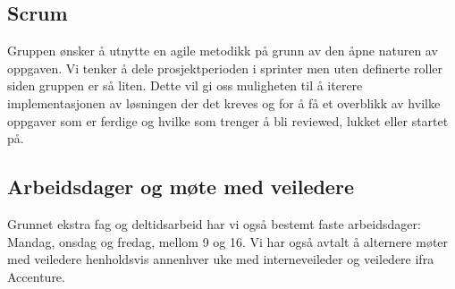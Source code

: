 \subsection{Scrum}
Gruppen ønsker å utnytte en agile metodikk på grunn av den åpne naturen av oppgaven. Vi tenker å dele prosjektperioden i sprinter men uten definerte roller siden gruppen er så liten. Dette vil gi oss muligheten til å iterere implementasjonen av løsningen der det kreves og for å få et overblikk av hvilke oppgaver som er ferdige og hvilke som trenger å bli reviewed, lukket eller startet på.

\subsection{Arbeidsdager og møte med veiledere}
Grunnet ekstra fag og deltidsarbeid har vi også bestemt faste arbeidsdager: Mandag, onsdag og fredag, mellom 9 og 16. Vi har også avtalt å alternere møter med veiledere henholdsvis annenhver uke med interneveileder og veiledere ifra Accenture.